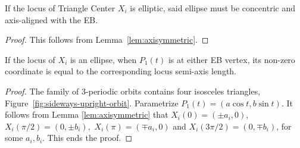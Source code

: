 \begin{lemma*}[\ref{lem:axisymmetric}]
If the locus of Triangle Center $X_i$ is elliptic, said ellipse must be concentric and axis-aligned with the EB.
\end{lemma*}

\begin{proof}
This follows from Lemma~\ref{lem:axisymmetric}.
\end{proof}


\begin{lemma*}[\ref{lem:center-cover}]
If the locus of $X_i$ is an ellipse, when $P_1(t)$ is at either EB vertex, its non-zero coordinate is equal to the corresponding locus semi-axis length.
\end{lemma*}

\begin{proof}
The family of 3-periodic orbits contains four isosceles triangles, Figure~\ref{fig:sideways-upright-orbit}. Parametrize $P_1(t)=(a\cos t,b\sin t)$. It follows from Lemma \ref{lem:axisymmetric} that $X_i(0)=(\pm a_i,0)$, $X_i(\pi/2)=(0,\pm b_i),$  $X_i(\pi)=(\mp a_i, 0)$ and $X_i(3\pi/2)=(0,\mp b_i)$, for some $a_i,b_i$. This ends the proof. %
\end{proof}






